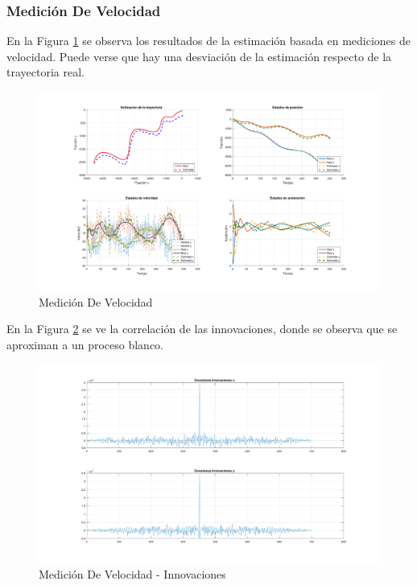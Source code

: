 		\subsubsection{Medición De Velocidad}
		
		En la Figura \ref{fig:ej2b} se observa los resultados de la estimación basada en mediciones de velocidad. Puede verse que hay una desviación de la estimación respecto de la trayectoria real.
		
		\begin{figure}[H]
			\centering
			\includegraphics[scale=0.5,trim={6,5cm 0 0 0}]{Figuras/graf_ej2b.pdf}
			\caption{Medición De Velocidad}
			\label{fig:ej2b}
		\end{figure}
		
		En la Figura \ref{fig:ej2b_innov} se ve la correlación de las innovaciones, donde se observa que se aproximan a un proceso blanco.
		
		\begin{figure}[H]
			\centering
			\includegraphics[width=1.0\textwidth,keepaspectratio]{Figuras/covinn_ej2b.pdf} \caption{Medición De Velocidad - Innovaciones} \label{fig:ej2b_innov}
		\end{figure}
			
